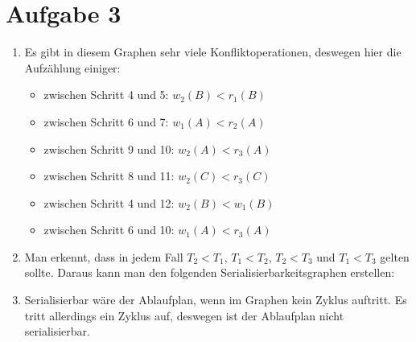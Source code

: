 \documentclass{article}
\begin{document}
	\section*{Aufgabe 3}
	\begin{enumerate}[label=(\alph*)]
		\item Es gibt in diesem Graphen sehr viele Konfliktoperationen, deswegen hier die Aufzählung einiger:
		\begin{itemize}
			\item zwischen Schritt 4 und 5: $w_2(B) < r_1(B)$
			\item zwischen Schritt 6 und 7: $w_1(A) < r_2(A)$
			\item zwischen Schritt 9 und 10: $w_2(A) < r_3(A)$
			\item zwischen Schritt 8 und 11: $w_2(C) < r_3(C)$
			\item zwischen Schritt 4 und 12: $w_2(B) < w_1(B)$
			\item zwischen Schritt 6 und 10: $w_1(A) < r_3(A)$
		\end{itemize}
		\item Man erkennt, dass in jedem Fall $T_2<T_1$, $T_1<T_2$, $T_2<T_3$ und $T_1<T_3$ gelten sollte. Daraus kann man den folgenden Serialisierbarkeitsgraphen erstellen:
		\begin{center}
		\end{center}
		\item Serialisierbar wäre der Ablaufplan, wenn im Graphen kein Zyklus auftritt. Es tritt allerdings ein Zyklus auf, deswegen ist der Ablaufplan nicht serialisierbar.
	\end{enumerate}
	
\end{document}
